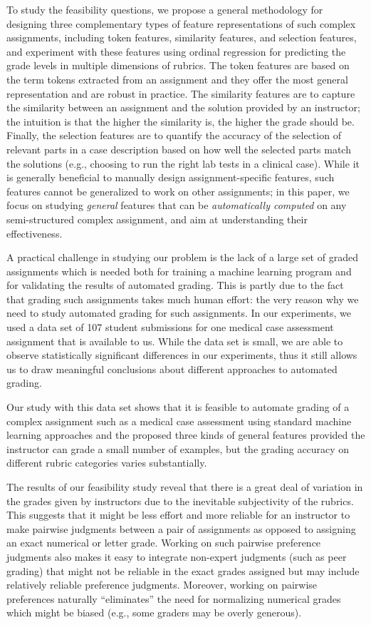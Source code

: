 To study the feasibility questions, we propose a general methodology for
designing three complementary types of feature representations of such
complex assignments, including token features, similarity features, and
selection features, and experiment with these features using ordinal
regression for predicting the grade levels in multiple dimensions of
rubrics. The token features are based on the term tokens extracted from an
assignment and they offer the most general representation and are robust in
practice. The similarity features are to capture the similarity between an
assignment and the solution provided by an instructor; the intuition is
that the higher the similarity is, the higher the grade should be.
Finally, the selection features are to quantify the accuracy of the
selection of relevant parts in a case description based on how well the
selected parts match the solutions (e.g., choosing to run the right
lab tests in a clinical case).  While it is generally beneficial to
manually design assignment-specific features, such features cannot be
generalized to work on other assignments; in this paper, we focus on
studying \emph{general} features that can be \emph{automatically computed}
on any semi-structured complex assignment, and aim at understanding their
effectiveness.

A practical challenge in studying our problem is the lack of a large set of
graded assignments which is needed both for training a machine learning
program and for validating the results of automated grading. This is partly
due to the fact that grading such assignments takes much human effort: the
very reason why we need to study automated grading for such assignments. In
our experiments, we used a data set of 107 student submissions for one
medical case assessment assignment that is available to us. While the data
set is small, we are able to observe statistically significant differences
in our experiments, thus it still allows us to draw meaningful conclusions
about different approaches to automated grading.

Our study with this data set shows that it is feasible to automate grading
of a complex assignment such as a medical case assessment using standard
machine learning approaches and the proposed three kinds of general
features provided the instructor can grade a small number of examples, but
the grading accuracy on different rubric categories varies substantially.

The results of our feasibility study reveal that there is a great deal of
variation in the grades given by instructors due to the inevitable
subjectivity of the rubrics. This suggests that it might be less effort
and more reliable for an instructor to make pairwise judgments between a
pair of assignments as opposed to assigning an exact numerical or letter
grade. Working on such pairwise preference judgments also makes it easy to
integrate non-expert judgments (such as peer grading) that might not be
reliable in the exact grades assigned but may include relatively reliable
preference judgments. Moreover, working on pairwise preferences naturally
``eliminates'' the need for normalizing numerical grades which might be
biased (e.g., some graders may be overly generous).

